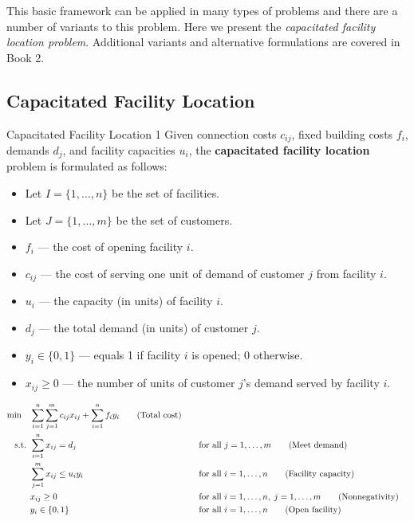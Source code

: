 This basic framework can be applied in many types of problems and there are a number of variants to this problem. Here we present the \emph{capacitated facility location problem}. Additional variants and alternative formulations are covered in Book 2.



\subsection{Capacitated Facility Location}

\begin{general}{Capacitated Facility Location 1}{\npcomplete}
Given connection costs \( c_{ij} \), fixed building costs \( f_i \), demands \( d_j \), and facility capacities \( u_i \), the \textbf{capacitated facility location} problem is formulated as follows:

\begin{itemize}
\item Let \( I = \{1,\dots, n\} \) be the set of facilities.
\item Let \( J = \{1, \dots, m\} \) be the set of customers.
\end{itemize}

\begin{itemize}
\item \( f_i \) — the cost of opening facility \( i \).
\item \( c_{ij} \) — the cost of serving one unit of demand of customer \( j \) from facility \( i \).
\item \( u_i \) — the capacity (in units) of facility \( i \).
\item \( d_j \) — the total demand (in units) of customer \( j \).
\end{itemize}

\begin{itemize}
\item \( y_i \in \{0,1\} \) — equals 1 if facility \( i \) is opened; 0 otherwise.
\item \( x_{ij} \geq 0 \) — the number of units of customer \( j \)'s demand served by facility \( i \).
\end{itemize}

\begin{align}
\min \quad & \sum_{i=1}^n \sum_{j=1}^m c_{ij} x_{ij} + \sum_{i=1}^n f_i y_i   \tag{Total cost} \\
\text{ s.t. }        & \sum_{i=1}^n x_{ij} = d_j &&\quad \text{for all } j = 1,\dots,m   \tag{Meet demand} \\
& \sum_{j=1}^m x_{ij} \leq u_i y_i &&\quad \text{for all } i = 1,\dots,n   \tag{Facility capacity} \\
& x_{ij} \geq 0 &&\quad \text{for all } i = 1,\dots,n,\; j = 1,\dots,m   \tag{Nonnegativity} \\
& y_i \in \{0,1\} &&\quad \text{for all } i = 1,\dots,n   \tag{Open facility}
\end{align}

\end{general}

